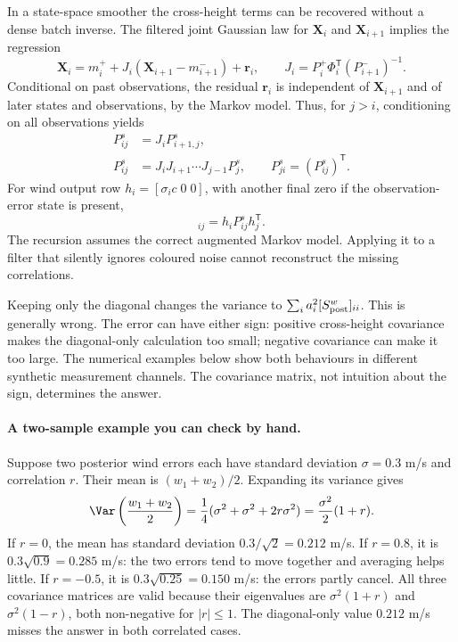 In a state-space smoother the cross-height terms can be recovered without a dense batch inverse. The filtered joint Gaussian law for $\mathbf X_i$ and $\mathbf X_{i+1}$ implies the regression
\begin{equation}
 \mathbf X_i=m_i^++J_i(\mathbf X_{i+1}-m_{i+1}^-)+\mathbf r_i,
 \qquad J_i=P_i^+\Phi_i^{\mathsf T}(P_{i+1}^-)^{-1}.
\end{equation}
Conditional on past observations, the residual $\mathbf r_i$ is independent of $\mathbf X_{i+1}$ and of later states and observations, by the Markov model. Thus, for $j>i$, conditioning on all observations yields
\begin{align}
 P^s_{ij}&=J_iP^s_{i+1,j},\\
 \boxed{P^s_{ij}}&=\boxed{J_iJ_{i+1}\cdots J_{j-1}P_j^s},\qquad
 P^s_{ji}=(P^s_{ij})^{\mathsf T}.
\end{align}
For wind output row $h_i=[\sigma_i c\;0\;0]$, with another final zero if the observation-error state is present,
\begin{equation}
 [S^w_{\rm post}]_{ij}=h_iP^s_{ij}h_j^{\mathsf T}.
\end{equation}
The recursion assumes the correct augmented Markov model. Applying it to a filter that silently ignores coloured noise cannot reconstruct the missing correlations.

Keeping only the diagonal changes the variance to $\sum_i a_i^2[S^w_{\rm post}]_{ii}$. This is generally wrong. The error can have either sign: positive cross-height covariance makes the diagonal-only calculation too small; negative covariance can make it too large. The numerical examples below show both behaviours in different synthetic measurement channels. The covariance matrix, not intuition about the sign, determines the answer.

\paragraph{A two-sample example you can check by hand.}
Suppose two posterior wind errors each have standard deviation $\sigma=0.3$ m/s and correlation $r$. Their mean is $(w_1+w_2)/2$. Expanding its variance gives
\begin{equation}
 \Var\left(\frac{w_1+w_2}{2}\right)
 =\frac14(\sigma^2+\sigma^2+2r\sigma^2)
 =\frac{\sigma^2}{2}(1+r).
\end{equation}
If $r=0$, the mean has standard deviation $0.3/\sqrt2=0.212$ m/s. If $r=0.8$, it is $0.3\sqrt{0.9}=0.285$ m/s: the two errors tend to move together and averaging helps little. If $r=-0.5$, it is $0.3\sqrt{0.25}=0.150$ m/s: the errors partly cancel. All three covariance matrices are valid because their eigenvalues are $\sigma^2(1+r)$ and $\sigma^2(1-r)$, both non-negative for $|r|\leq1$. The diagonal-only value $0.212$ m/s misses the answer in both correlated cases.

